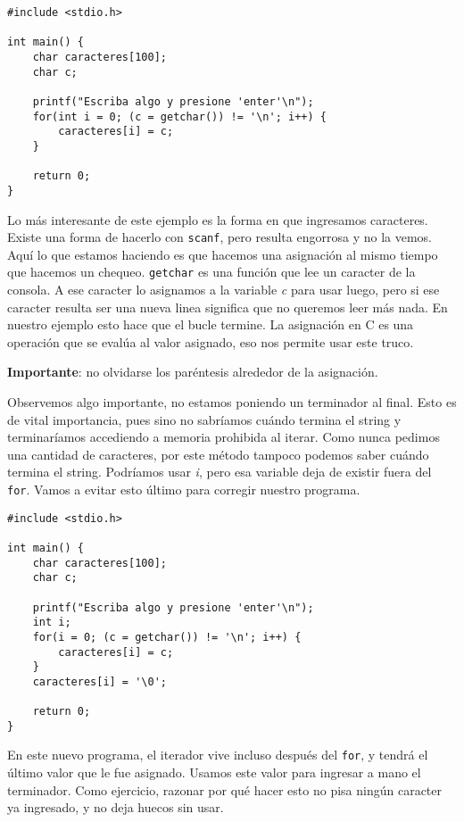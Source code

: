 \documentclass[10pt]{article}
\newcommand{\cscanf}[0]{\lstinline{scanf}}
\newcommand{\cfor}[0]{\lstinline{for}}
\begin{document}
\begin{lstlisting}
#include <stdio.h>

int main() {
	char caracteres[100];
	char c;

	printf("Escriba algo y presione 'enter'\n");
	for(int i = 0; (c = getchar()) != '\n'; i++) {
		caracteres[i] = c;
	}

	return 0;
}
\end{lstlisting}

Lo más interesante de este ejemplo es la forma en que ingresamos caracteres. Existe una forma de hacerlo con \cscanf, pero resulta engorrosa y no la vemos. Aquí lo que estamos haciendo es que hacemos una asignación al mismo tiempo que hacemos un chequeo. \lstinline{getchar} es una función que lee un caracter de la consola. A ese caracter lo asignamos a la variable \textit{c} para usar luego, pero si ese caracter resulta ser una nueva linea significa que no queremos leer más nada. En nuestro ejemplo esto hace que el bucle termine. La asignación en C es una operación que se evalúa al valor asignado, eso nos permite usar este truco.

\bigskip

\textbf{Importante}: no olvidarse los paréntesis alrededor de la asignación.

\bigskip

Observemos algo importante, no estamos poniendo un terminador al final. Esto es de vital importancia, pues sino no sabríamos cuándo termina el string y terminaríamos accediendo a memoria prohibida al iterar. Como nunca pedimos una cantidad de caracteres, por este método tampoco podemos saber cuándo termina el string. Podríamos usar \textit{i}, pero esa variable deja de existir fuera del \cfor. Vamos a evitar esto último para corregir nuestro programa.

\begin{lstlisting}
#include <stdio.h>

int main() {
	char caracteres[100];
	char c;

	printf("Escriba algo y presione 'enter'\n");
	int i;
	for(i = 0; (c = getchar()) != '\n'; i++) {
		caracteres[i] = c;
	}
	caracteres[i] = '\0';

	return 0;
}
\end{lstlisting}

En este nuevo programa, el iterador vive incluso después del \cfor, y tendrá el último valor que le fue asignado. Usamos este valor para ingresar a mano el terminador. Como ejercicio, razonar por qué hacer esto no pisa ningún caracter ya ingresado, y no deja huecos sin usar.
\end{document}
